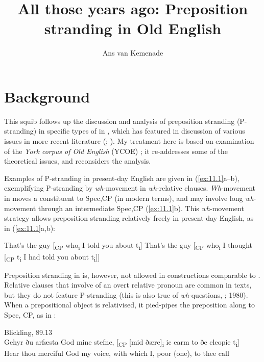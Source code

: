 \documentclass[output=paper]{langsci/langscibook}
\author{Ans van Kemenade\affiliation{Radboud University}}
\title{All those years ago: Preposition stranding in Old English}
\begin{document}
\glsresetall

\section{Background}

This squib follows up the discussion and analysis of preposition stranding
(P-stranding)  in specific types of   in
\citet{vanKemenade1987}, which has featured in discussion of various issues in
more recent literature (\citealt{Alcorn2014}; \citealt{EmoFaa2014}).  My
treatment here is based on examination of the \textit{York corpus of Old
English} (\gls{YCOE}) \parencite{Tayloretal2003}; it
re-addresses some of the theoretical issues, and reconsiders the analysis.

Examples of P-stranding in present-day English are
given in (\ref{ex:11.1}a--b), exemplifying P-stranding by
\textit{wh}-movement in \textit{wh}-relative clauses. \textit{Wh}-movement in
 moves a constituent to Spec,CP (in modern terms), and
may involve long \textit{wh}-movement through an intermediate Spec,CP
(\ref{ex:11.1}b). This \textit{wh}-movement strategy allows preposition
stranding relatively freely in present-day English, as in
(\ref{ex:11.1}a,b):\pagebreak

\ea%
    \label{ex:11.1}
	\ea That’s the guy [\textsubscript{CP} who\textsubscript{i} I told you about t\textsubscript{i}]
	\ex That’s the guy [\textsubscript{CP} who\textsubscript{i} I thought [\textsubscript{CP} t\textsubscript{i} I had told you about t\textsubscript{i}]]
	\z
\z

Preposition stranding in  is, however, not allowed in constructions
comparable to . Relative clauses that involve  of an
overt relative pronoun are common in  texts, but they do not feature
P-stranding (this is also true of \textit{wh}-questions, \citealt{Allen1977};
1980). When a prepositional object is relativised, it pied-pipes the
preposition along to Spec, CP, as in :

\ea Blickling, 89.13 \parencite[270]{Allen1980}\label{ex:11.2}\\
    \gll Gehyr ðu arfæsta God mine stefne, [\textsubscript{CP} [mid ðære]\textsubscript{i}   ic earm {}  to ðe cleopie  t\textsubscript{i}]\\
    Hear thou merciful God my voice, {} with \hphantom{[}which I, poor (one), to thee call\\
\z
\end{document}
